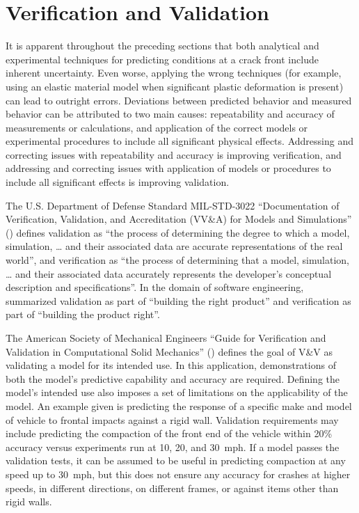 \section{Verification and Validation}
It is apparent throughout the preceding sections that both analytical and experimental techniques for predicting conditions at a crack front include inherent uncertainty.
Even worse, applying the wrong techniques (for example, using an elastic material model when significant plastic deformation is present) can lead to outright errors.
Deviations between predicted behavior and measured behavior can be attributed to two main causes:
repeatability and accuracy of measurements or calculations,
and
application of the correct models or experimental procedures to include all significant physical effects.
Addressing and correcting issues with repeatability and accuracy is improving verification,
and
addressing and correcting issues with application of models or procedures to include all significant effects is improving validation.%

The U.S. Department of Defense Standard MIL-STD-3022 ``Documentation of Verification, Validation, and Accreditation (VV\&A) for Models and Simulations'' (\citeyear{mil-std-3022}) defines validation as ``the process of determining the degree to which a model, simulation, \ldots{} and their associated data are accurate representations of the real world'', and verification as ``the process of determining that a model, simulation, \ldots{} and their associated data accurately represents the developer's conceptual description and specifications''.
In the domain of software engineering, \citet{boehm1989} summarized validation as part of ``building the right product'' and verification as part of ``building the product right''.

The American Society of Mechanical Engineers ``Guide for Verification and Validation in Computational Solid Mechanics'' (\citeyear{asme-vv}) defines the goal of V\&V as validating a model for its intended use.
In this application, demonstrations of both the model's predictive capability and accuracy are required.
Defining the model's intended use also imposes a set of limitations on the applicability of the model.
An example given is predicting the response of a specific make and model of vehicle to frontal impacts against a rigid wall.
Validation requirements may include predicting the compaction of the front end of the vehicle within 20\% accuracy versus experiments run at 10, 20, and 30~mph.
If a model passes the validation tests, it can be assumed to be useful in predicting compaction at any speed up to 30~mph, but this does not ensure any accuracy for crashes at higher speeds, in different directions, on different frames, or against items other than rigid walls.

